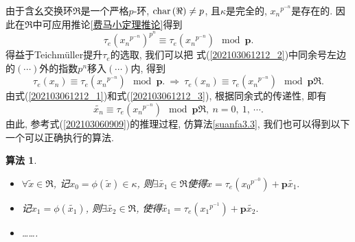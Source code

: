 \documentclass[UTF8, twoside]{ctexart}
\theoremstyle{nonumberplain}
\theoremstyle{nonumberplain}
\theoremstyle{plain}
\newtheorem{suanfa4}[dingyi4]{算法}
\begin{document}
	由于含幺交换环$\Re$是一个严格$p$-环, $\textup{char}\left( \Re  \right)\ne p$, 
	且$\kappa$是完全的, ${{x}_{n}}^{{{p}^{-n}}}$是存在的.
	因此在$\Re$中可应用推论\ref{费马小定理推论}得到
	\begin{equation} \label{202103061212_2}
		\tau_e {{\left( {{x}_{n}}^{{{p}^{-n}}} \right)}^{{{p}^{n}}}}\equiv \tau_e \left( {{x}_{n}}^{{{p}^{-n}}} \right)\ \bmod \bm{p}.
	\end{equation}
	得益于Teichmüller提升$\tau_e$的选取, 我们可以把
	式(\ref{202103061212_2})中同余号左边的$\left( \cdots  \right)$外的指数${{p}^{n}}$移入$\left( \cdots  \right)$内, 得到
	\begin{equation} \label{202103061212_3}
		\tau_e \left( {{x}_{n}} \right)\equiv {{\tau_e }}\left( {{x}_{n}}^{{{p}^{-n}}} \right)\ \bmod \bm{p}.
		\ \Longrightarrow \ 
		\tau_e \left( {{x}_{n}} \right)\equiv {{\tau_e }}\left( {{x}_{n}}^{{{p}^{-n}}} \right)\ \bmod \bm{p}\Re .
	\end{equation}
	由式(\ref{202103061212_1})和式(\ref{202103061212_3}), 根据同余式的传递性, 即有
	\begin{equation} \label{202103061212_4}
		\widetilde{{{x}_{n}}}\equiv {{\tau }_{e}}\left( {{x}_{n}}^{{{p}^{-n}}} \right)\ \bmod \bm{p}\Re ,\ n=0,\ 1,\ \cdots.
	\end{equation}
	由此, 参考式(\ref{202103060909})的推理过程, 仿算法\ref{suanfa3.3}, 
	我们也可以得到以下一个可以正确执行的算法.
	\newpage
	\begin{suanfa4} \label{suanfa3.3改进}
		\ 
		\begin{itemize}
			\item $\forall \widetilde{x}\in \Re $, 记${{x}_{0}}=\phi \left( \widetilde{x} \right)\in \kappa $, 则$\exists \widetilde{{{x}_{1}}}\in \Re $使得$\widetilde{x}=\tau_e \left( {{x}_{0}}^{{{p}^{-0}}} \right)+\bm{p}\widetilde{{{x}_{1}}}.$
			
			\item 记${{x}_{1}}=\phi \left( \widetilde{{{x}_{1}}} \right)$, 则$\exists \widetilde{{{x}_{2}}}\in \Re $, 使得$\widetilde{{{x}_{1}}}=\tau_e \left( {{x}_{1}}^{{{p}^{-1}}} \right)+\bm{p}\widetilde{{{x}_{2}}}.$
			
			\item \ldots \ldots .
		\end{itemize}
	\end{suanfa4}
	\vskip 0.5cm
	
\end{document}
